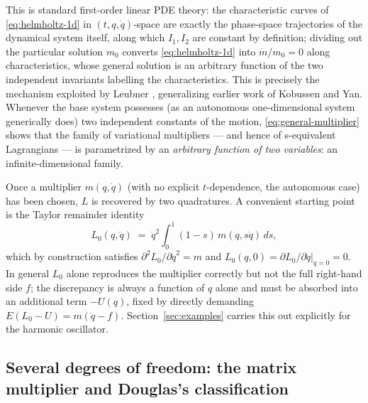 \documentclass[11pt]{article}
\theoremstyle{remark}
\begin{document}
This is standard first-order linear PDE theory: the characteristic curves of \eqref{eq:helmholtz-1d} in $(t,q,\dot q)$-space are exactly the phase-space trajectories of the dynamical system itself, along which $I_1,I_2$ are constant by definition; dividing out the particular solution $m_0$ converts \eqref{eq:helmholtz-1d} into $\dot m/m_0=0$ along characteristics, whose general solution is an arbitrary function of the two independent invariants labelling the characteristics. This is precisely the mechanism exploited by Leubner \cite{Leubner1981}, generalizing earlier work of Kobussen \cite{Kobussen1979} and Yan. Whenever the base system possesses (as an autonomous one-dimensional system generically does) two independent constants of the motion, \eqref{eq:general-multiplier} shows that the family of variational multipliers --- and hence of s-equivalent Lagrangians --- is parametrized by an \emph{arbitrary function of two variables}: an infinite-dimensional family.

Once a multiplier $m(q,\dot q)$ (with no explicit $t$-dependence, the autonomous case) has been chosen, $L$ is recovered by two quadratures. A convenient starting point is the Taylor remainder identity
\begin{equation}
L_0(q,\dot q) \;=\; \dot q^2\int_0^1 (1-s)\,m(q,s\dot q)\,ds ,
\label{eq:homotopy}
\end{equation}
which by construction satisfies $\partial^2 L_0/\partial \dot q^2 = m$ and $L_0(q,0)=\partial L_0/\partial \dot q|_{\dot q=0}=0$. In general $L_0$ alone reproduces the multiplier correctly but not the full right-hand side $f$; the discrepancy is always a function of $q$ alone and must be absorbed into an additional term $-U(q)$, fixed by directly demanding $E(L_0-U)=m(\ddot q-f)$. Section~\ref{sec:examples} carries this out explicitly for the harmonic oscillator.

\subsection{Several degrees of freedom: the matrix multiplier and Douglas's classification}
\label{sec:helmholtz-ndof}
\end{document}
